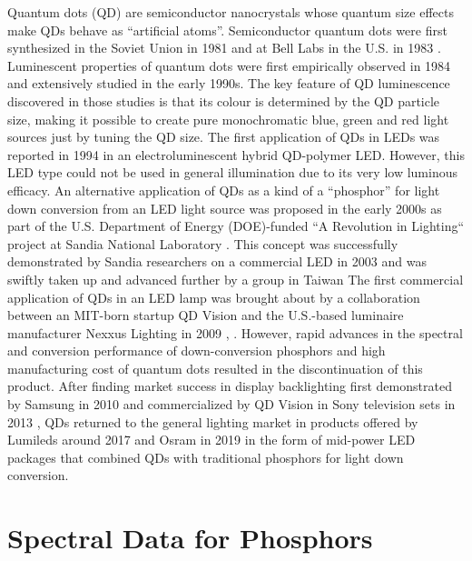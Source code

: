 \documentclass[parskip=full]{article}
\begin{document}
Quantum dots (QD) are semiconductor nanocrystals whose quantum size effects make QDs behave as “artificial atoms”. Semiconductor quantum dots were first synthesized in the Soviet Union in 1981 \cite{ekimov1981quantum} and at Bell Labs in the U.S. in 1983 \cite{Rossetti1983}. Luminescent properties of quantum dots were first empirically observed in 1984 \cite{fojtik1984photo} and extensively studied in the early 1990s. The key feature of QD luminescence discovered in those studies is that its colour is determined by the QD particle size, making it possible to create pure monochromatic blue, green and red light sources just by tuning the QD size. The first application of QDs in LEDs was reported in 1994 in an electroluminescent hybrid QD-polymer LED. However, this LED type could not be used in general illumination due to its very low luminous efficacy. An alternative application of QDs as a kind of a “phosphor” for light down conversion from an LED light source was proposed in the early 2000s as part of the U.S. Department of Energy (DOE)-funded “A Revolution in Lighting“ project at Sandia National Laboratory \cite{simmonsfinal}. This concept was successfully demonstrated by Sandia researchers on a commercial LED in 2003 \cite{shea_rohwer_development_2004}\cite{noauthor_sandia_nodate} and was swiftly taken up and advanced further by a group in Taiwan \cite{Chen_2005}\cite{Hsueh_Shih_Chen_2006} The first commercial application of QDs in an LED lamp was brought about by a collaboration between an MIT-born startup QD Vision and the U.S.-based luminaire manufacturer Nexxus Lighting in 2009 \cite{ledprof_nexxusqd}, \cite{bourzac2013quantum}. However, rapid advances in the spectral and conversion performance of down-conversion phosphors and high manufacturing cost of quantum dots resulted in the discontinuation of this product. After finding market success in display backlighting first demonstrated by Samsung in 2010 \cite{Jang2010} and commercialized by QD Vision in Sony television sets in 2013 \cite{bourzac2013quantum}, QDs returned to the general lighting market in products offered by Lumileds \cite{noauthor_global_2017}\cite{noauthor_quantum_2020} around 2017 and Osram in 2019 \cite{osramqdots} in the form of mid-power LED packages that combined QDs with traditional phosphors for light down conversion.

\section{Spectral Data for Phosphors}
\end{document}
